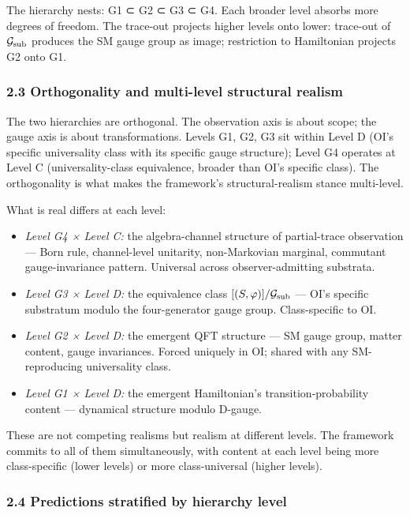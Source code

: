 \documentclass[
]{article}
\providecommand{\tightlist}{%
  \setlength{\itemsep}{0pt}\setlength{\parskip}{0pt}}
\begin{document}
The hierarchy nests: G1 ⊂ G2 ⊂ G3 ⊂ G4. Each broader level absorbs more
degrees of freedom. The trace-out projects higher levels onto lower:
trace-out of \(\mathcal{G}_{\rm sub}\) produces the SM gauge group as
image; restriction to Hamiltonian projects G2 onto G1.

\hypertarget{orthogonality-and-multi-level-structural-realism}{%
\subsubsection{2.3 Orthogonality and multi-level structural
realism}\label{orthogonality-and-multi-level-structural-realism}}

The two hierarchies are orthogonal. The observation axis is about scope;
the gauge axis is about transformations. Levels G1, G2, G3 sit within
Level D (OI's specific universality class with its specific gauge
structure); Level G4 operates at Level C (universality-class
equivalence, broader than OI's specific class). The orthogonality is
what makes the framework's structural-realism stance multi-level.

What is real differs at each level:

\begin{itemize}
\tightlist
\item
  \emph{Level G4 × Level C:} the algebra-channel structure of
  partial-trace observation --- Born rule, channel-level unitarity,
  non-Markovian marginal, commutant gauge-invariance pattern. Universal
  across observer-admitting substrata.
\item
  \emph{Level G3 × Level D:} the equivalence class
  \([(S, \varphi)]/\mathcal{G}_{\rm sub}\) --- OI's specific substratum
  modulo the four-generator gauge group. Class-specific to OI.
\item
  \emph{Level G2 × Level D:} the emergent QFT structure --- SM gauge
  group, matter content, gauge invariances. Forced uniquely in OI;
  shared with any SM-reproducing universality class.
\item
  \emph{Level G1 × Level D:} the emergent Hamiltonian's
  transition-probability content --- dynamical structure modulo D-gauge.
\end{itemize}

These are not competing realisms but realism at different levels. The
framework commits to all of them simultaneously, with content at each
level being more class-specific (lower levels) or more class-universal
(higher levels).

\hypertarget{predictions-stratified-by-hierarchy-level}{%
\subsubsection{2.4 Predictions stratified by hierarchy
level}\label{predictions-stratified-by-hierarchy-level}}
\end{document}
